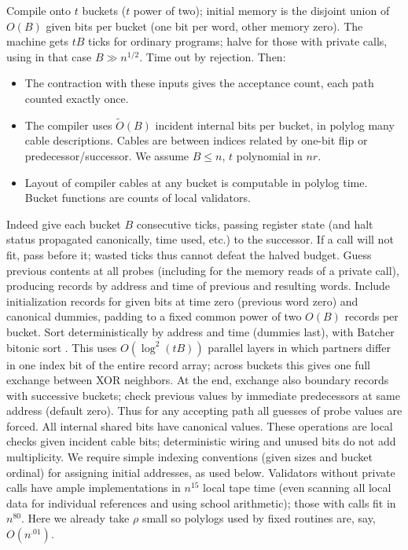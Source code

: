 \documentclass[11pt,letterpaper]{article}
\theoremstyle{definition}
\numberwithin{equation}{section}
\begin{document}
Compile onto $t$ buckets ($t$ power of two); initial memory is the disjoint union of $O(B)$
given bits per bucket (one bit per word, other memory zero). The machine gets $tB$ ticks for
ordinary programs; halve for those with private calls, using in that case $B\gg n^{1/2}$. Time
out by rejection. Then:

\begin{itemize}
\item The contraction with these inputs gives the acceptance count, each path counted
exactly once.
\item The compiler uses $\widetilde{O}(B)$ incident internal bits per bucket, in polylog many cable
descriptions. Cables are between indices related by one-bit flip or predecessor/successor.
We assume $B\le n$, $t$ polynomial in $nr$.
\item Layout of compiler cables at any bucket is computable in polylog time. Bucket functions
are counts of local validators.
\end{itemize}

Indeed give each bucket $B$ consecutive ticks, passing register state (and halt status propagated
canonically, time used, etc.) to the successor. If a call will not fit, pass before it; wasted
ticks thus cannot defeat the halved budget. Guess previous contents at all probes (including
for the memory reads of a private call), producing records by address and time of previous
and resulting words. Include initialization records for given bits at time zero (previous word
zero) and canonical dummies, padding to a fixed common power of two $O(B)$ records per
bucket. Sort deterministically by address and time (dummies last), with Batcher bitonic
sort \cite{Batcher}. This uses $O(\log^2(tB))$ parallel layers in which partners differ in one index bit of
the entire record array; across buckets this gives one full exchange between XOR neighbors.
At the end, exchange also boundary records with successive buckets; check previous values
by immediate predecessors at same address (default zero). Thus for any accepting path all
guesses of probe values are forced. All internal shared bits have canonical values. These
operations are local checks given incident cable bits; deterministic wiring and unused bits
do not add multiplicity. We require simple indexing conventions (given sizes and bucket
ordinal) for assigning initial addresses, as used below. Validators without private calls have
ample implementations in $n^{15}$ local tape time (even scanning all local data for individual
references and using school arithmetic); those with calls fit in $n^{80}$. Here we already take $\rho$
small so polylogs used by fixed routines are, say, $O(n^{.01})$.
\end{document}
